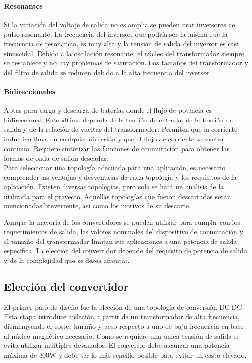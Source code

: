 \paragraph{Resonantes}
Si la variación del voltaje de salida no es amplia se pueden usar inversores de pulso resonante. 
La frecuencia del inversor, que podría ser la misma que la frecuencia de resonancia, es muy alta y la tensión de salida del inversor es casi sinusoidal.
Debido a la oscilación resonante, el núcleo del transformador siempre se restablece y no hay problemas de saturación. 
Los tamaños del transformador y del filtro de salida se reducen debido a la alta frecuencia del inversor.

\paragraph{Bidireccionales}
Aptas para carga y descarga de baterías donde el flujo de potencia es bidireccional.
Este último depende de la tensión de entrada, de la tensión de salida y de la relación de vueltas del transformador. 
Permiten que la corriente inductiva fluya en cualquier dirección y que el flujo de corriente se vuelva continuo.
Requiere sintetizar las funciones de conmutación para obtener las formas de onda de salida deseadas.\\

Para seleccionar una topología adecuada para una aplicación, es necesario comprender las ventajas y desventajas de cada topología y los requisitos de la aplicación. 
Existen diversas topologías, pero solo se hará un analisis de la utilizada para el proyecto.
Aquellas topologías que fueron descartadas serán mencionadas brevemente, asi como los motivos de su descarte.

Aunque la mayoría de los convertidores se pueden utilizar para cumplir con los requerimientos de salida, 
los valores nominales del dispositivo de conmutación y el tamaño del transformador limitan sus aplicaciones a una potencia de salida específica. 
La elección del convertidor depende del requisito de potencia de salida y de la complejidad que se desea afrontar.

\subsection{Elección del convertidor}

El primer paso de diseño fue la elección de una topología de conversión DC-DC.
Esta etapa introduce aislación a partir de un transformador de alta frecuencia,
disminuyendo el coste, tamaño y peso respecto a uno de baja frecuencia en base al núcleo magnético necesario.
Como se requiere una única tensión de salida se evita utilizar múltiples devanados.
El conversor debe alcanzar una potencia máxima de 300W y debe ser lo más sencillo posible para evitar un costo elevado. 

